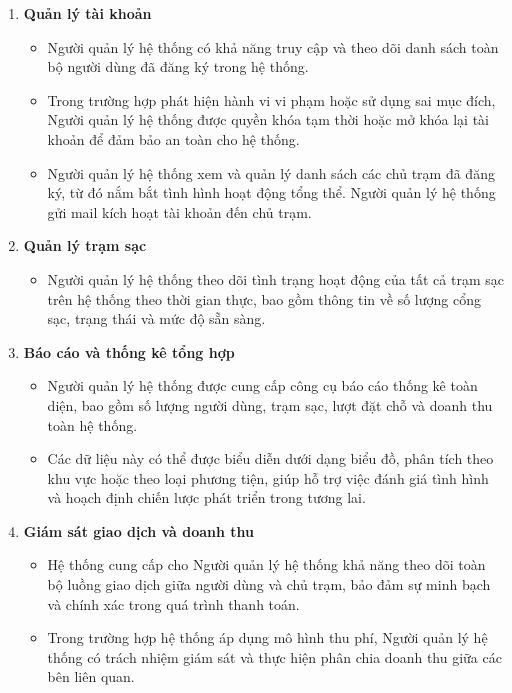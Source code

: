 \begin{enumerate}[label=\textbf{\alph*)}]
 \item \textbf{Quản lý tài khoản}
 \begin{itemize}
    \item Người quản lý hệ thống có khả năng truy cập và theo dõi danh sách toàn bộ người dùng đã đăng ký trong hệ thống.
    \item Trong trường hợp phát hiện hành vi vi phạm hoặc sử dụng sai mục đích, Người quản lý hệ thống được quyền khóa tạm thời hoặc mở khóa lại tài khoản để đảm bảo an toàn cho hệ thống.
    \item Người quản lý hệ thống xem và quản lý danh sách các chủ trạm đã đăng ký, từ đó nắm bắt tình hình hoạt động tổng thể. Người quản lý hệ thống gửi mail kích hoạt tài khoản đến chủ trạm.
 \end{itemize}
 \item \textbf{Quản lý trạm sạc}
 \begin{itemize}
    \item Người quản lý hệ thống theo dõi tình trạng hoạt động của tất cả trạm sạc trên hệ thống theo thời gian thực, bao gồm thông tin về số lượng cổng sạc, trạng thái và mức độ sẵn sàng.
 \end{itemize}
 \item \textbf{Báo cáo và thống kê tổng hợp}
 \begin{itemize}
    \item Người quản lý hệ thống được cung cấp công cụ báo cáo thống kê toàn diện, bao gồm số lượng người dùng, trạm sạc, lượt đặt chỗ và doanh thu toàn hệ thống.
    \item Các dữ liệu này có thể được biểu diễn dưới dạng biểu đồ, phân tích theo khu vực hoặc theo loại phương tiện, giúp hỗ trợ việc đánh giá tình hình và hoạch định chiến lược phát triển trong tương lai.
 \end{itemize}  
 \item \textbf{Giám sát giao dịch và doanh thu}
 \begin{itemize}
    \item Hệ thống cung cấp cho Người quản lý hệ thống khả năng theo dõi toàn bộ luồng giao dịch giữa người dùng và chủ trạm, bảo đảm sự minh bạch và chính xác trong quá trình thanh toán.
    \item Trong trường hợp hệ thống áp dụng mô hình thu phí, Người quản lý hệ thống có trách nhiệm giám sát và thực hiện phân chia doanh thu giữa các bên liên quan.
 \end{itemize}
\end{enumerate}


